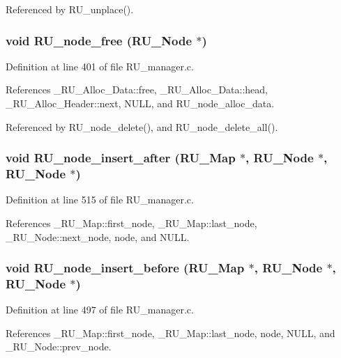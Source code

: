 Referenced by RU\_\-unplace().
\subsubsection{\setlength{\rightskip}{0pt plus 5cm}void RU\_\-node\_\-free (\bf{RU\_\-Node} $\ast$)}\label{RU__manager_8h_94dd726cb909a5be4ce976dd05f2608a}




Definition at line 401 of file RU\_\-manager.c.

References \_\-RU\_\-Alloc\_\-Data::free, \_\-RU\_\-Alloc\_\-Data::head, \_\-RU\_\-Alloc\_\-Header::next, NULL, and RU\_\-node\_\-alloc\_\-data.

Referenced by RU\_\-node\_\-delete(), and RU\_\-node\_\-delete\_\-all().
\subsubsection{\setlength{\rightskip}{0pt plus 5cm}void RU\_\-node\_\-insert\_\-after (\bf{RU\_\-Map} $\ast$, \bf{RU\_\-Node} $\ast$, \bf{RU\_\-Node} $\ast$)}\label{RU__manager_8h_fe34e62f6f57acd366429acf665dbd39}




Definition at line 515 of file RU\_\-manager.c.

References \_\-RU\_\-Map::first\_\-node, \_\-RU\_\-Map::last\_\-node, \_\-RU\_\-Node::next\_\-node, node, and NULL.
\subsubsection{\setlength{\rightskip}{0pt plus 5cm}void RU\_\-node\_\-insert\_\-before (\bf{RU\_\-Map} $\ast$, \bf{RU\_\-Node} $\ast$, \bf{RU\_\-Node} $\ast$)}\label{RU__manager_8h_0708a98451689e5e0b8aed7b577d987d}




Definition at line 497 of file RU\_\-manager.c.

References \_\-RU\_\-Map::first\_\-node, \_\-RU\_\-Map::last\_\-node, node, NULL, and \_\-RU\_\-Node::prev\_\-node.


